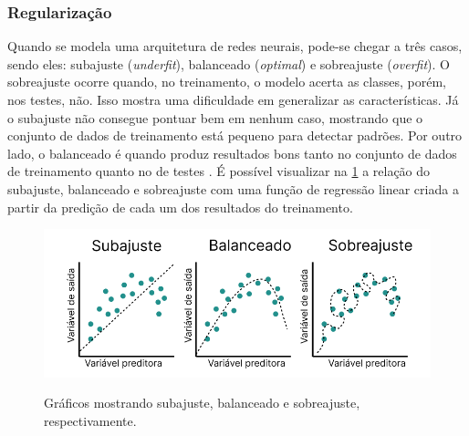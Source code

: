 \subsubsection*{Regularização}

Quando se modela uma arquitetura de redes neurais, pode-se chegar a três casos, sendo eles: subajuste (\textit{underfit}), balanceado (\textit{optimal}) e sobreajuste (\textit{overfit}). O sobreajuste ocorre quando, no treinamento, o modelo acerta as classes, porém, nos testes, não. Isso mostra uma dificuldade em generalizar as características. Já o subajuste não consegue pontuar bem em nenhum caso, mostrando que o conjunto de dados de treinamento está pequeno para detectar padrões. Por outro lado, o balanceado é quando produz resultados bons tanto no conjunto de dados de treinamento quanto no de testes \space\cite{Alzubaidi2021, computation11030052}. É possível visualizar na \cref{fig:fittings} a relação do subajuste, balanceado e sobreajuste com uma função de regressão linear criada a partir da predição de cada um dos resultados do treinamento.

\begin{figure}[ht]
\caption{Gráficos mostrando subajuste, balanceado e sobreajuste, respectivamente.}
\centering %
\includegraphics[width=15cm]{figures/fittings.png} %
\label{fig:fittings}
\end{figure}
